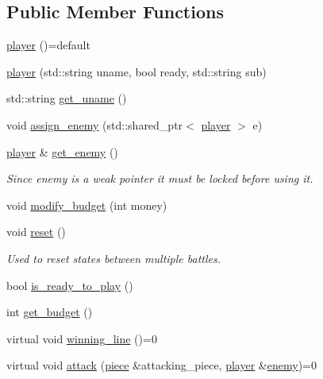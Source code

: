 \subsection*{Public Member Functions}
\begin{DoxyCompactItemize}
\item 
\hyperlink{classbattle__ship_1_1player_a54df3c03653a24049b9629ce5c55fafa}{player} ()=default
\item 
\hyperlink{classbattle__ship_1_1player_a9c5da318ece63c6bdd3825cfa6ea9b4f}{player} (std\+::string uname, bool ready, std\+::string sub)
\item 
std\+::string \hyperlink{classbattle__ship_1_1player_a4a5406b436812664cb706c31b745239b}{get\+\_\+uname} ()
\item 
void \hyperlink{classbattle__ship_1_1player_a3525c2934ea6a4bd7600385cb5fa6bfa}{assign\+\_\+enemy} (std\+::shared\+\_\+ptr$<$ \hyperlink{classbattle__ship_1_1player}{player} $>$ e)
\item 
\hyperlink{classbattle__ship_1_1player}{player} \& \hyperlink{classbattle__ship_1_1player_a5224958feae654d622f56523dc45ab83}{get\+\_\+enemy} ()
\begin{DoxyCompactList}\small\item\em Since enemy is a weak pointer it must be locked before using it. \end{DoxyCompactList}\item 
void \hyperlink{classbattle__ship_1_1player_ade02279db7265558659c40f16c482df7}{modify\+\_\+budget} (int money)
\item 
void \hyperlink{classbattle__ship_1_1player_ae21fefa953f6a3a0476cabfae7084bbf}{reset} ()
\begin{DoxyCompactList}\small\item\em Used to reset states between multiple battles. \end{DoxyCompactList}\item 
bool \hyperlink{classbattle__ship_1_1player_af5373e08a637e9c21b3751eb02e07540}{is\+\_\+ready\+\_\+to\+\_\+play} ()
\item 
int \hyperlink{classbattle__ship_1_1player_ac2e25657d2330845c3770a75d107fef5}{get\+\_\+budget} ()
\item 
virtual void \hyperlink{classbattle__ship_1_1player_a3110ec708fd8fc7e02a6e88a63d57d2f}{winning\+\_\+line} ()=0
\item 
virtual void \hyperlink{classbattle__ship_1_1player_a86be2256620cd5e20da6db7be8afdbc8}{attack} (\hyperlink{classbattle__ship_1_1piece}{piece} \&attacking\+\_\+piece, \hyperlink{classbattle__ship_1_1player}{player} \&\hyperlink{classbattle__ship_1_1player_af01292346caaf209039b6490ae18d8aa}{enemy})=0

\end{DoxyCompactItemize}
